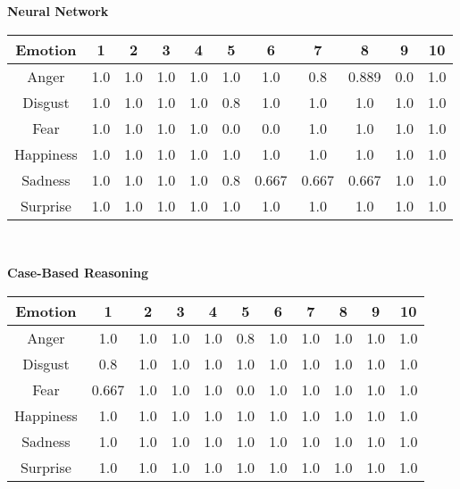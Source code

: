 \documentclass[a4paper]{article}
\begin{document}
 {\bf Neural Network}\\

\begin{center}
  \begin{tabular}{|c|cccccccccc|}
  \hline
    Emotion & 1 & 2 & 3 & 4 & 5 & 6 & 7 & 8 & 9 & 10 \\
    \hline
    Anger 	& 1.0 & 1.0 & 1.0 & 1.0 & 1.0 & 1.0 & 0.8 & 0.889 & 0.0 & 1.0 \\
	Disgust & 1.0 & 1.0 & 1.0 & 1.0 & 0.8 & 1.0 & 1.0 & 1.0 & 1.0 & 1.0 \\
	Fear 	& 1.0 & 1.0 & 1.0 & 1.0 & 0.0 & 0.0 & 1.0 & 1.0 & 1.0 & 1.0 \\
	Happiness 	& 1.0 & 1.0 & 1.0 & 1.0 & 1.0 & 1.0 & 1.0 & 1.0 & 1.0 & 1.0 \\
	Sadness 	& 1.0 & 1.0 & 1.0 & 1.0 & 0.8 & 0.667 & 0.667 & 0.667 & 1.0 & 1.0 \\
	Surprise 	& 1.0 & 1.0 & 1.0 & 1.0 & 1.0 & 1.0 & 1.0 & 1.0 & 1.0 & 1.0 \\
	\hline
  \end{tabular}\\
  \end{center}
  
  {\bf Case-Based Reasoning}\\

\begin{center}
  \begin{tabular}{|c|cccccccccc|}
  \hline
    Emotion & 1 & 2 & 3 & 4 & 5 & 6 & 7 & 8 & 9 & 10 \\
    \hline
    Anger 	& 1.0 & 1.0 & 1.0 & 1.0 & 0.8 & 1.0 & 1.0 & 1.0 & 1.0 & 1.0 \\
	Disgust & 0.8 & 1.0 & 1.0 & 1.0 & 1.0 & 1.0 & 1.0 & 1.0 & 1.0 & 1.0 \\
	Fear 	& 0.667 & 1.0 & 1.0 & 1.0 & 0.0 & 1.0 & 1.0 & 1.0 & 1.0 & 1.0 \\
	Happiness 	& 1.0 & 1.0 & 1.0 & 1.0 & 1.0 & 1.0 & 1.0 & 1.0 & 1.0 & 1.0 \\
	Sadness 	& 1.0 & 1.0 & 1.0 & 1.0 & 1.0 & 1.0 & 1.0 & 1.0 & 1.0 & 1.0 \\
	Surprise 	& 1.0 & 1.0 & 1.0 & 1.0 & 1.0 & 1.0 & 1.0 & 1.0 & 1.0 & 1.0 \\
	\hline
  \end{tabular}\\
  \end{center}
 
\end{document}
